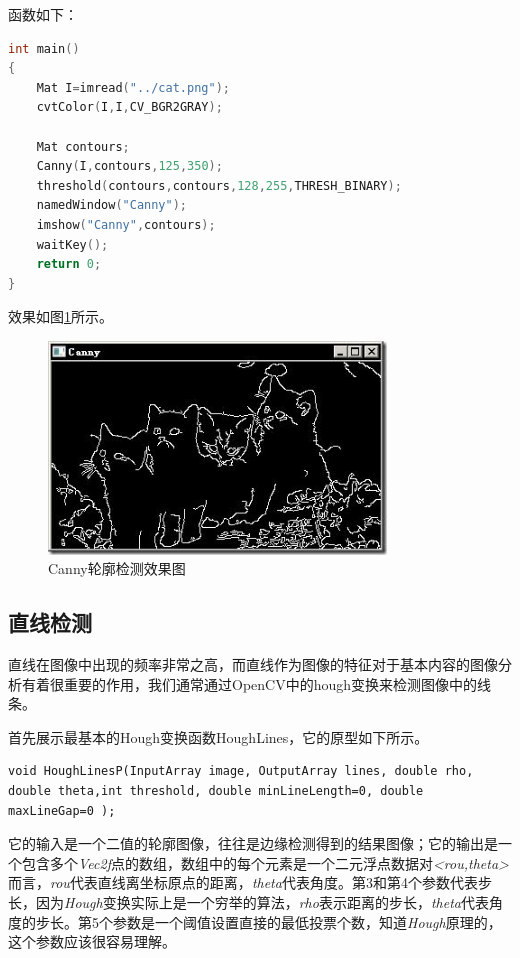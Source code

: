 \documentclass{XDBAthesis}
\begin{document}
函数如下：
\begin{lstlisting}[language=C]
int main() 
{ 
    Mat I=imread("../cat.png"); 
    cvtColor(I,I,CV_BGR2GRAY); 
                                                 
    Mat contours; 
    Canny(I,contours,125,350); 
    threshold(contours,contours,128,255,THRESH_BINARY); 
    namedWindow("Canny"); 
    imshow("Canny",contours); 
    waitKey(); 
    return 0; 
} 
\end{lstlisting}
效果如图\ref{fg:Canny}所示。
\begin{figure}[htb]
    \centering
    \includegraphics[width=0.8\textwidth ]{figure/cat}
    \caption{Canny轮廓检测效果图}
    \label{fg:Canny}
\end{figure}


\subsection{直线检测}

直线在图像中出现的频率非常之高，而直线作为图像的特征对于基本内容的图像分析有着很重要的作用，我们通常通过OpenCV中的hough变换来检测图像中的线条。

首先展示最基本的Hough变换函数HoughLines，它的原型如下所示。
\begin{lstlisting}
void HoughLinesP(InputArray image, OutputArray lines, double rho, double theta,int threshold, double minLineLength=0, double maxLineGap=0 ); 
\end{lstlisting}

 

    它的输入是一个二值的轮廓图像，往往是边缘检测得到的结果图像；它的输出是一个包含多个\emph{Vec2f}点的数组，数组中的每个元素是一个二元浮点数据对\emph{<rou,theta>}而言，\emph{rou}代表直线离坐标原点的距离，\emph{theta}代表角度。第3和第4个参数代表步长，因为\emph{Hough}变换实际上是一个穷举的算法，\emph{rho}表示距离的步长，\emph{theta}代表角度的步长。第5个参数是一个阈值设置直接的最低投票个数，知道\emph{Hough}原理的，这个参数应该很容易理解。
\end{document}
